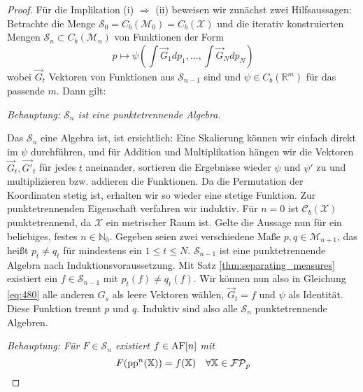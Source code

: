 \begin{proof}
        Für die Implikation (i) $\Rightarrow$ (ii) beweisen wir zunächst zwei Hilfsaussagen: Betrachte die Menge $\mathcal{S}_0= C_b(\mathcal{M}_0) = C_b(\mathcal{X})$ und die iterativ konstruierten Mengen $\mathcal{S}_n \subset C_b(\mathcal{M}_n)$ von Funktionen der Form
        \begin{equation}\label{eq:480}
            p \mapsto \psi\left( \int \vec{G}_1dp_1, ..., \int \vec{G}_N dp_N\right)
        \end{equation}
        wobei $\vec{G}_t$ Vektoren von Funktionen aus $\mathcal{S}_{n-1}$ sind und $\psi \in C_b(\mathbb{R}^m)$ für das passende $m$. Dann gilt: 

        \emph{Behauptung: $\mathcal{S}_n$ ist eine punktetrennende Algebra.}

        Das $\mathcal{S}_n$ eine Algebra ist, ist ersichtlich: Eine Skalierung können wir einfach direkt im $\psi$ durchführen, und für Addition und Multiplikation hängen wir die Vektoren $\vec{G}_t, \vec{G'}_t$ für jedes $t$ aneinander, sortieren die Ergebnisse wieder $\psi$ und $\psi'$ zu und multiplizieren bzw. addieren die Funktionen. Da die Permutation der Koordinaten stetig ist, erhalten wir so wieder eine stetige Funktion. Zur punktetrennenden Eigenschaft verfahren wir induktiv. Für $n=0$ ist $\mathcal{C}_b(\mathcal{X})$ punktetrennend, da $\mathcal{X}$ ein metrischer Raum ist. Gelte die Aussage nun für ein beliebiges, festes $n \in \mathbb{N}_0$. Gegeben seien zwei verschiedene Maße $p,q \in \mathcal{M}_{n+1}$, das heißt $p_t\neq q_t$ für mindestens ein $1\leq t\leq N$. $\mathcal{S}_{n-1}$ ist eine punktetrennende Algebra nach Induktionsvoraussetzung. Mit Satz \ref{thm:separating_measures} existiert ein $f \in \mathcal{S}_{n-1}$ mit $p_t(f) \neq q_t(f)$. Wir können nun also in Gleichung \ref{eq:480} alle anderen $G_s$ als leere Vektoren wählen, $\vec{G}_t = f$ und $\psi$ als Identität. Diese Funktion trennt $p$ und $q$. Induktiv sind also alle $\mathcal{S}_n$ punktetrennende Algebren.

        \emph{Behauptung: Für $F\in \mathcal{S}_n$ existiert $f \in \operatorname{AF}[n]$ mit 
        $$F(\operatorname{pp}^n(\mathbb{X})) = f(\mathbb{X}) \quad \forall \mathbb{X} \in \mathcal{FP}_p$$}


\end{proof}
